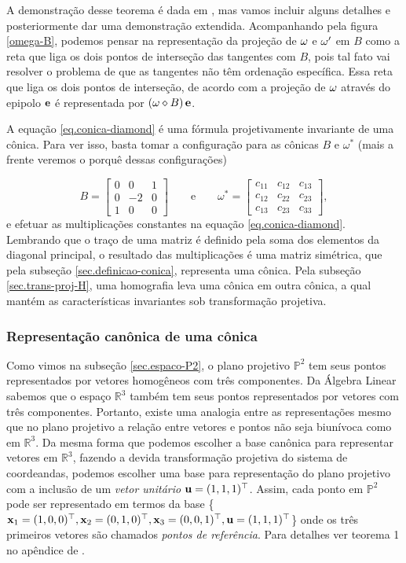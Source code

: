  A demonstração desse teorema é dada em \cite{2503343}, mas vamos incluir alguns detalhes e posteriormente dar uma demonstração extendida. Acompanhando pela figura \ref{omega-B}, podemos pensar na representação da projeção de  ${\bf \omega}$ e ${\bf \omega'}$ em $B$ como a reta que liga os dois pontos de interseção das tangentes com $B$, pois tal fato vai resolver o problema de que as tangentes não têm ordenação específica. Essa reta que liga os dois pontos de interseção, de acordo com a projeção de ${\bf \omega}$ através do epipolo ${\bf e}$ é representada por $({\bf \omega}\diamond B)\,{\bf e}$.

A equação \ref{eq.conica-diamond} é uma fórmula projetivamente invariante de uma cônica. Para ver isso, basta tomar a configuração para as cônicas $B$ e $\omega^*$ (mais a frente veremos o porquê dessas configurações)

\begin{equation*}
B=
\begin{bmatrix}
0&0&1\\
0&-2&0\\
1&0&0
\end{bmatrix}
\qquad\text{e}\qquad
\omega^*=
\begin{bmatrix}
c_{11}&c_{12}&c_{13}\\
c_{12}&c_{22}&c_{23}\\
c_{13}&c_{23}&c_{33}
\end{bmatrix},
\end{equation*} 
e efetuar as multiplicações constantes na equação \ref{eq.conica-diamond}. Lembrando que o traço de uma matriz é definido pela soma dos elementos da diagonal principal, o resultado das multiplicações é uma matriz simétrica, que pela subseção \ref{sec.definicao-conica}, representa uma cônica. Pela subseção \ref{sec.trans-proj-H}, uma homografia leva uma cônica em outra cônica, a qual mantém as características invariantes sob transformação projetiva.

\subsubsection{Representação canônica de uma cônica}\label{sec.forma-canonica-B}

Como vimos na subseção \ref{sec.espaco-P2}, o plano projetivo $\mathbb{P}^2$ tem seus pontos representados por vetores homogêneos com três componentes. Da Álgebra Linear sabemos que o espaço $\mathbb{R}^3$ também tem seus pontos representados por vetores com três componentes. Portanto, existe uma analogia entre as representações mesmo que no plano projetivo a relação entre vetores e pontos não seja biunívoca como em $\mathbb{R}^3$. Da mesma forma que podemos escolher a base canônica para representar vetores em $\mathbb{R}^3$, fazendo a devida transformação projetiva do sistema de coordeandas, podemos escolher uma base para representação do plano projetivo com a inclusão de um \textit{vetor unitário} ${\bf u}=(1,1,1)^\top$. Assim, cada ponto em $\mathbb{P}^2$ pode ser representado em termos da base \{$\mathbf{x}_1=(1,0,0)^\top,\mathbf{x}_2=(0,1,0)^\top,\mathbf{x}_3=(0,0,1)^\top,{\bf u}=(1,1,1)^\top$\} onde os três primeiros vetores são chamados {\it pontos de referência}. Para detalhes ver teorema 1 no apêndice  de \citep{kneebone}.

